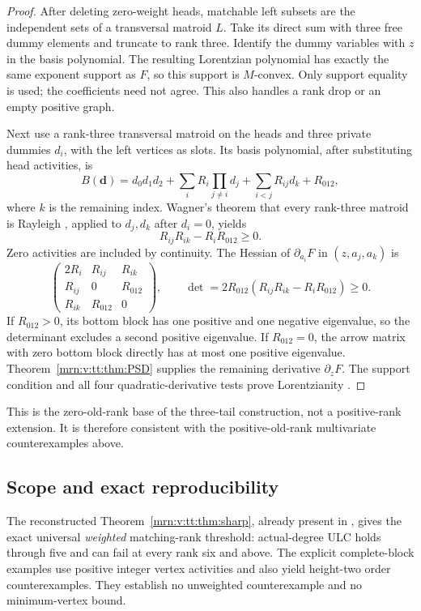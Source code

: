 \documentclass[11pt,a4paper]{article}
\theoremstyle{remark}\newtheorem{remark}[theorem]{Remark}
\begin{document}
\begin{proof}
After deleting zero-weight heads, matchable left subsets are the independent sets of a transversal matroid $L$. Take its direct sum with three free dummy elements and truncate to rank three. Identify the dummy variables with $z$ in the basis polynomial. The resulting Lorentzian polynomial has exactly the same exponent support as $F$, so this support is $M$-convex. Only support equality is used; the coefficients need not agree. This also handles a rank drop or an empty positive graph.

Next use a rank-three transversal matroid on the heads and three private dummies $d_i$, with the left vertices as slots. Its basis polynomial, after substituting head activities, is
\[
 B(\mathbf d)=d_0d_1d_2+\sum_iR_i\prod_{j\ne i}d_j
                   +\sum_{i<j}R_{ij}d_k+R_{012},
\]
where $k$ is the remaining index. Wagner's theorem that every rank-three matroid is Rayleigh \cite[Theorem 1.1]{b:Wagner}, applied to $d_j,d_k$ after $d_i=0$, yields
\[
 R_{ij}R_{ik}-R_iR_{012}\ge0.
\]
Zero activities are included by continuity. The Hessian of $\partial_{a_i}F$ in $(z,a_j,a_k)$ is
\[
 \begin{pmatrix}2R_i&R_{ij}&R_{ik}\\R_{ij}&0&R_{012}\\R_{ik}&R_{012}&0\end{pmatrix},
 \qquad \det=2R_{012}(R_{ij}R_{ik}-R_iR_{012})\ge0.
\]
If $R_{012}>0$, its bottom block has one positive and one negative eigenvalue, so the determinant excludes a second positive eigenvalue. If $R_{012}=0$, the arrow matrix with zero bottom block directly has at most one positive eigenvalue. Theorem~\ref{mrn:v:tt:thm:PSD} supplies the remaining derivative $\partial_zF$. The support condition and all four quadratic-derivative tests prove Lorentzianity \cite[Theorem 2.25]{b:BH}.
\end{proof}
This is the zero-old-rank base of the three-tail construction, not a positive-rank extension. It is therefore consistent with the positive-old-rank multivariate counterexamples above.

\subsection{Scope and exact reproducibility}
The reconstructed Theorem~\ref{mrn:v:tt:thm:sharp}, already present in \cite{b:m74}, gives the exact universal \emph{weighted} matching-rank threshold: actual-degree ULC holds through five and can fail at every rank six and above. The explicit complete-block examples use positive integer vertex activities and also yield height-two order counterexamples. They establish no unweighted counterexample and no minimum-vertex bound.
\end{document}
